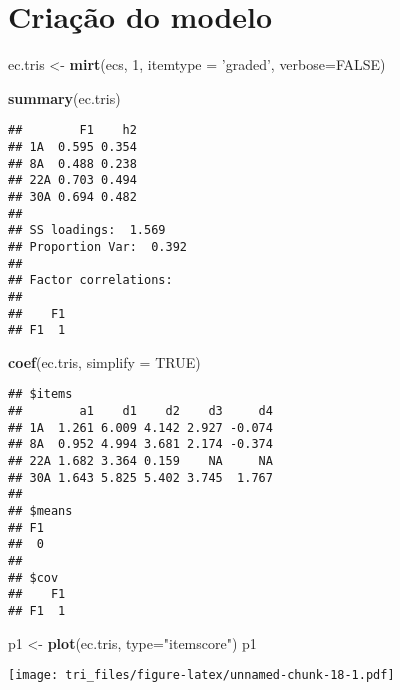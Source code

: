 \documentclass[]{article}
\newenvironment{Shaded}{\begin{snugshade}}{\end{snugshade}}
\newcommand{\KeywordTok}[1]{\textcolor[rgb]{0.13,0.29,0.53}{\textbf{#1}}}
\newcommand{\DataTypeTok}[1]{\textcolor[rgb]{0.13,0.29,0.53}{#1}}
\newcommand{\DecValTok}[1]{\textcolor[rgb]{0.00,0.00,0.81}{#1}}
\newcommand{\StringTok}[1]{\textcolor[rgb]{0.31,0.60,0.02}{#1}}
\newcommand{\OtherTok}[1]{\textcolor[rgb]{0.56,0.35,0.01}{#1}}
\newcommand{\NormalTok}[1]{#1}
\begin{document}
\section{Criação do modelo}\label{criacao-do-modelo-1}

\begin{Shaded}
\begin{Highlighting}[]
\NormalTok{ec.tris <-}\StringTok{ }\KeywordTok{mirt}\NormalTok{(ecs, }\DecValTok{1}\NormalTok{, }\DataTypeTok{itemtype =} \StringTok{'graded'}\NormalTok{, }\DataTypeTok{verbose=}\OtherTok{FALSE}\NormalTok{)}
\end{Highlighting}
\end{Shaded}

\begin{Shaded}
\begin{Highlighting}[]
\KeywordTok{summary}\NormalTok{(ec.tris)}
\end{Highlighting}
\end{Shaded}

\begin{verbatim}
##        F1    h2
## 1A  0.595 0.354
## 8A  0.488 0.238
## 22A 0.703 0.494
## 30A 0.694 0.482
## 
## SS loadings:  1.569 
## Proportion Var:  0.392 
## 
## Factor correlations: 
## 
##    F1
## F1  1
\end{verbatim}

\begin{Shaded}
\begin{Highlighting}[]
\KeywordTok{coef}\NormalTok{(ec.tris, }\DataTypeTok{simplify =} \OtherTok{TRUE}\NormalTok{)}
\end{Highlighting}
\end{Shaded}

\begin{verbatim}
## $items
##        a1    d1    d2    d3     d4
## 1A  1.261 6.009 4.142 2.927 -0.074
## 8A  0.952 4.994 3.681 2.174 -0.374
## 22A 1.682 3.364 0.159    NA     NA
## 30A 1.643 5.825 5.402 3.745  1.767
## 
## $means
## F1 
##  0 
## 
## $cov
##    F1
## F1  1
\end{verbatim}

\begin{Shaded}
\begin{Highlighting}[]
\NormalTok{p1 <-}\StringTok{ }\KeywordTok{plot}\NormalTok{(ec.tris, }\DataTypeTok{type=}\StringTok{"itemscore"}\NormalTok{)}
\NormalTok{p1}
\end{Highlighting}
\end{Shaded}

\texttt{[image: tri\_files/figure-latex/unnamed-chunk-18-1.pdf]}
\end{document}

